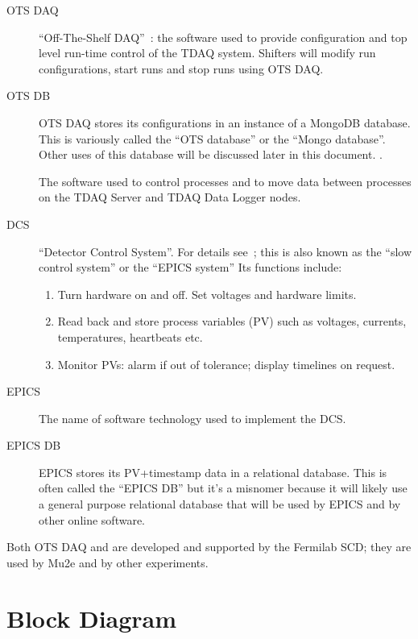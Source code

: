 \begin{description}
\item[OTS DAQ] ``Off-The-Shelf DAQ''~\cite{MU2EOTSDAQ}: the software used to provide configuration and top level run-time control of the TDAQ system.
  Shifters will modify run configurations, start runs and stop runs using OTS DAQ.
\item[OTS DB] OTS DAQ stores its configurations in an instance of a MongoDB database.  This is variously called the ``OTS database'' or the ``Mongo database''.
  Other uses of this database will be discussed later in this document. .
\item[\artdaq] The software used to control processes and to move data between processes on the TDAQ Server and TDAQ Data Logger nodes.
\item[DCS] ``Detector Control System''.
  For details see~\cite{DCSSpec};
  this is also known as the ``slow control system'' or the ``EPICS system''
  Its functions include:
  \begin{enumerate}
    \item Turn hardware on and off. Set voltages and hardware limits.
    \item Read back and store process variables (PV) such as voltages, currents, temperatures, heartbeats etc.
    \item Monitor PVs: alarm if out of tolerance; display timelines on request.
  \end{enumerate}
\item[EPICS] The name of software technology used to implement the DCS.
\item[EPICS DB] EPICS stores its PV+timestamp data in a relational database.
  This is often called the ``EPICS DB'' but it's a misnomer because it will likely use
  a general purpose relational database that will be used by EPICS
  and by other online software.
\end{description}
Both OTS DAQ and \artdaq are developed and supported by the Fermilab SCD;
they are used by Mu2e and by other experiments.


\section{Block Diagram}
\label{sec:BlockDiagram}

